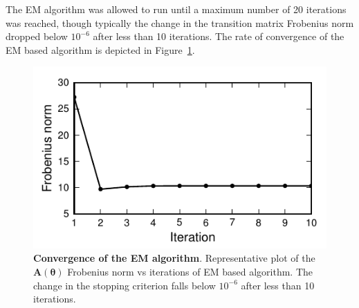\documentclass[review,authoryear,3p]{elsarticle}
\begin{document}
The EM algorithm was allowed to run until a maximum number of 20 iterations was reached, though typically the change in the transition matrix Frobenius norm dropped below $10^{-6}$ after less than 10 iterations. The rate of convergence of the EM based algorithm is depicted in Figure~\ref{fig:MRA-Convergence}. 
\begin{figure}[!t] 
 	\centering
 		\includegraphics[scale=1]{./Graph/ConvergenceRate.pdf}
 		\caption{{\bf Convergence of the EM algorithm}. Representative plot of
the $\mathbf A(\boldsymbol\theta)$ Frobenius norm vs iterations of EM based algorithm. The change in the stopping criterion falls below $10^{-6}$ after less than 10 iterations.}
 	\label{fig:MRA-Convergence}
 \end{figure}     
\end{document}
